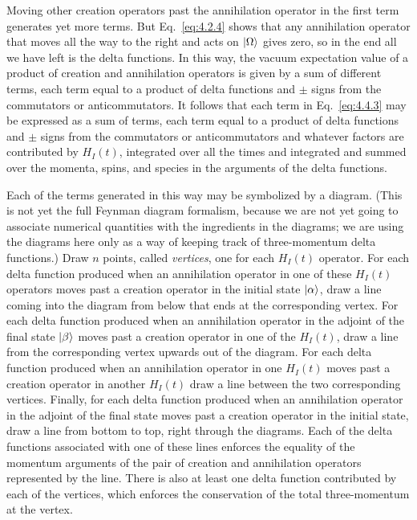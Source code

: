Moving other creation operators past the annihilation operator in the first
term generates yet more terms. But Eq.~\eqref{eq:4.2.4} shows that any annihilation
operator that moves all the way to the right and acts on $\lvert \Omega\rangle$ gives
zero, so in the end all we have left is the delta functions. In this way, the
vacuum expectation value of a product of creation and annihilation operators is
given by a sum of different terms, each term equal to a product of delta
functions and $\pm$ signs from the commutators or anticommutators. It follows
that each term in Eq.~\eqref{eq:4.4.3} may be expressed as a sum of terms, each term
equal to a product of delta functions and $\pm$ signs from the commutators or
anticommutators and whatever factors are contributed by $H_I(t)$, integrated
over all the times and integrated and summed over the momenta, spins, and
species in the arguments of the delta functions.

Each of the terms generated in this way may be symbolized by a diagram. (This
is not yet the full Feynman diagram formalism, because we are not yet going to
associate numerical quantities with the ingredients in the diagrams; we are
using the diagrams here only as a way of keeping track of three-momentum delta
functions.) Draw $n$ points, called \emph{vertices}, one for each $H_I(t)$
operator. For each delta function produced when an annihilation operator in one
of these $H_I(t)$ operators moves past a creation operator in the initial state
$\lvert \alpha\rangle$, draw a line coming into the diagram from below that ends at the
corresponding vertex. For each delta function produced when an annihilation
operator in the adjoint of the final state $\lvert \beta\rangle$ moves past a creation
operator in one of the $H_I(t)$, draw a line from the corresponding vertex
upwards out of the diagram. For each delta function produced when an
annihilation operator in one $H_I(t)$ moves past a creation operator in another
$H_I(t)$ draw a line between the two corresponding vertices. Finally, for each
delta function produced when an annihilation operator in the adjoint of the
final state moves past a creation operator in the initial state, draw a line
from bottom to top, right through the diagrams. Each of the delta functions
associated with one of these lines enforces the equality of the momentum
arguments of the pair of creation and annihilation operators represented by the
line. There is also at least one delta function contributed by each of the
vertices, which enforces the conservation of the total three-momentum at the
vertex.

